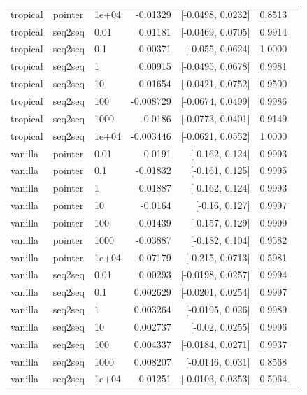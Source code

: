 \documentclass[10pt]{article}
\begin{document}
{\begin{longtable}{lllrrrl}
tropical & pointer & 1e+04 & -0.01329 & [-0.0498, 0.0232] & 0.8513 & \\
tropical & seq2seq & 0.01 & 0.01181 & [-0.0469, 0.0705] & 0.9914 & \\
tropical & seq2seq & 0.1 & 0.00371 & [-0.055, 0.0624] & 1.0000 & \\
tropical & seq2seq & 1 & 0.00915 & [-0.0495, 0.0678] & 0.9981 & \\
tropical & seq2seq & 10 & 0.01654 & [-0.0421, 0.0752] & 0.9500 & \\
tropical & seq2seq & 100 & -0.008729 & [-0.0674, 0.0499] & 0.9986 & \\
tropical & seq2seq & 1000 & -0.0186 & [-0.0773, 0.0401] & 0.9149 & \\
tropical & seq2seq & 1e+04 & -0.003446 & [-0.0621, 0.0552] & 1.0000 & \\
vanilla & pointer & 0.01 & -0.0191 & [-0.162, 0.124] & 0.9993 & \\
vanilla & pointer & 0.1 & -0.01832 & [-0.161, 0.125] & 0.9995 & \\
vanilla & pointer & 1 & -0.01887 & [-0.162, 0.124] & 0.9993 & \\
vanilla & pointer & 10 & -0.0164 & [-0.16, 0.127] & 0.9997 & \\
vanilla & pointer & 100 & -0.01439 & [-0.157, 0.129] & 0.9999 & \\
vanilla & pointer & 1000 & -0.03887 & [-0.182, 0.104] & 0.9582 & \\
vanilla & pointer & 1e+04 & -0.07179 & [-0.215, 0.0713] & 0.5981 & \\
vanilla & seq2seq & 0.01 & 0.00293 & [-0.0198, 0.0257] & 0.9994 & \\
vanilla & seq2seq & 0.1 & 0.002629 & [-0.0201, 0.0254] & 0.9997 & \\
vanilla & seq2seq & 1 & 0.003264 & [-0.0195, 0.026] & 0.9989 & \\
vanilla & seq2seq & 10 & 0.002737 & [-0.02, 0.0255] & 0.9996 & \\
vanilla & seq2seq & 100 & 0.004337 & [-0.0184, 0.0271] & 0.9937 & \\
vanilla & seq2seq & 1000 & 0.008207 & [-0.0146, 0.031] & 0.8568 & \\
vanilla & seq2seq & 1e+04 & 0.01251 & [-0.0103, 0.0353] & 0.5064 & \\
\bottomrule
\end{longtable}
}
\end{document}
